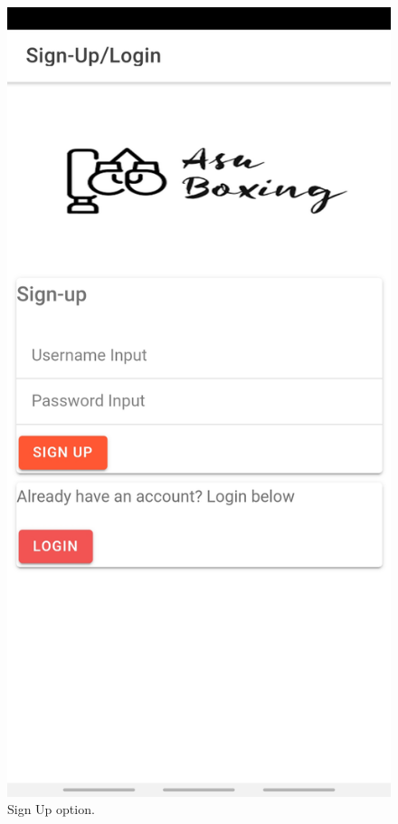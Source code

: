 \documentclass[a4paper,12pt]{report}
\begin{document}
\begin{figure}[ht]
\begin{minipage}[b]{0.5\linewidth}
    \includegraphics[width=.7\linewidth]{images/aplicationImages/logInSignIn.jpeg} 
    \caption{Sign Up option.} 
    \vspace{4ex}
  \end{minipage}%
  \begin{minipage}[b]{0.5\linewidth}
    \centering

\end{minipage}
\end{figure}
\end{document}
